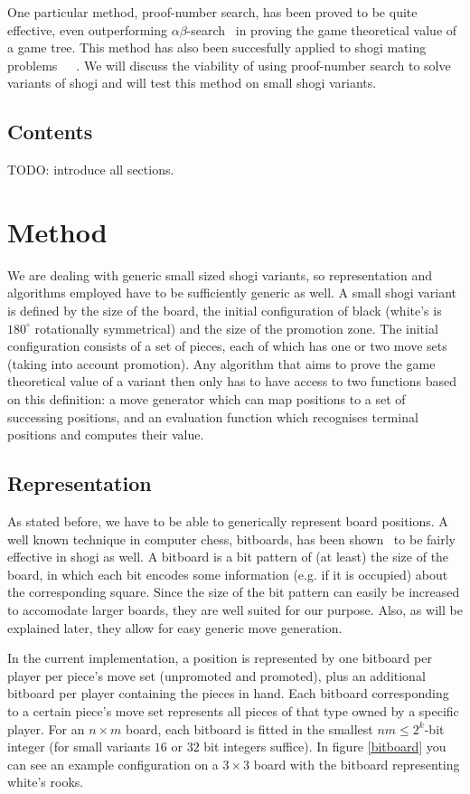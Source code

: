 \documentclass{article}
\begin{document}
One particular method, proof-number search, has been proved to be quite effective, even outperforming $\alpha\beta$-search~\cite{van2008proof} in
proving the game theoretical value of a game tree. This method has also been succesfully applied to shogi mating
problems~\cite{seo2001pn}~\cite{ueda2008weak}~\cite{sakuta2001performance}. We will discuss the viability of using proof-number search to solve variants of shogi and will test
this method on small shogi variants.

\subsection{Contents}
TODO: introduce all sections.

\section{Method}
We are dealing with generic small sized shogi variants, so representation and algorithms employed have to be sufficiently generic as well.
A small shogi variant is defined by the size of the board, the initial configuration of black (white's is $180^{\circ}$ rotationally symmetrical) and
the size of the promotion zone. The initial configuration consists of a set of pieces, each of which has one or two move sets (taking into account
promotion). Any algorithm that aims to prove the game theoretical value of a variant then only has to have access to two functions based on this
definition: a move generator which can map positions to a set of successing positions, and an evaluation function which recognises terminal
positions and computes their value.

\subsection{Representation}
As stated before, we have to be able to generically represent board positions. A well known technique in computer chess, bitboards, has been
shown~\cite{grimbergen2007using} to be fairly effective in shogi as well. A bitboard is a bit pattern of (at least) the size of the board,
in which each bit encodes some information (e.g. if it is occupied) about the corresponding square. Since the size of the bit pattern can
easily be increased to accomodate larger boards, they are well suited for our purpose. Also, as will be explained later, they allow for easy
generic move generation.

In the current implementation, a position is represented by one bitboard per player per piece's move set (unpromoted and promoted), plus an additional
bitboard per player containing the pieces in hand. Each bitboard corresponding to a certain piece's move set represents all pieces of that type
owned by a specific player. For an $n \times m$ board, each bitboard is fitted in the smallest $nm \leq 2^k$-bit integer (for small
variants $16$ or $32$ bit integers suffice). In figure \ref{bitboard} you can see an example configuration on a $3 \times 3$ board with the
bitboard representing white's rooks.
\end{document}
